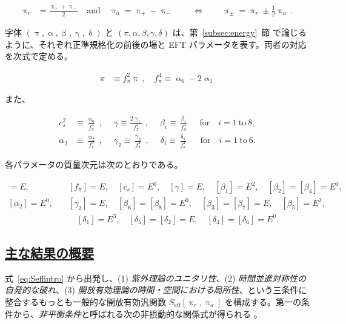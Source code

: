 \documentclass[a4paper,11pt]{ltjsarticle}
\newcommand{\subsectionlink}[1]{\subsection[#1]{\hyperlink{toc}{#1}}}
\numberwithin{equation}{section}
\def\uppia{\uppi_{a}}
\def\uppir{\uppi_{r}}
\newcommand{\Eq}[1]{Eq.~(\ref{#1})}
\newcommand{\Sec}[1]{Sec.~\ref{#1}}
\renewcommand{\Eq}[1]{式~\eqref{#1}}
\renewcommand{\Sec}[1]{第~\ref{#1}~節}
\begin{document}
\begin{align}
\uppi_r &= \frac{\uppi_+ + \uppi_-}{2} \quad \mathrm{and} \quad \uppi_a = \uppi_+ - \uppi_-\, \qquad \Leftrightarrow \qquad  \uppi_\pm =\uppir\pm \frac12 \uppia\,.
\end{align}

字体 $(\uppi,\upalpha,\upbeta,\upgamma,\updelta)$ と $(\pi,\alpha,\beta,\gamma,\delta)$ は、\Sec{subsec:energy} で論じるように、それぞれ正準規格化の前後の場と EFT パラメータを表す。両者の対応を次式で定める。

\begin{align}
\pi &\equiv f_\pi^2 \uppi\,, \quad f_\pi^4 \equiv \upalpha_0 -2 \upalpha_1
\end{align}

また、

\begin{align}
c_s^{2} &\equiv \frac{\upalpha_{0}}{f_\pi^4}\;,\quad\; \gamma \equiv
 \frac{2\upgamma_{1}}{f_\pi^4}\;,\quad\;\beta_{i} \equiv \frac{\upbeta_{i}}{f_{\pi}^{4}}\;\quad\mathrm{for}\quad i = 1 ~\mathrm{to}~8, \\
\alpha_2 &\equiv \frac{\upalpha_2}{f_\pi^4}\;,\quad\; \gamma_2 \equiv \frac{\upgamma_{4}}{f_\pi^4} \;,\quad\; \delta_i \equiv \frac{\updelta_{i}}{f_\pi^4} \quad ~~\mathrm{for}\quad i = 1 ~\mathrm{to}~6.
\end{align}

各パラメータの質量次元は次のとおりである。

\begin{align}
[\pi] = E, &\quad [f_\pi] = E, \quad [c_s] = E^0, \quad [\gamma] = E, \quad [\beta_1] = E^2, \quad [\beta_2] = [\beta_4] = E^0, \\
[\alpha_2] = E^{0}, &\quad [\gamma_2] = E, \quad [\beta_6] =  [\beta_8] = E^0, \quad [\beta_3] = [\beta_7] = E, \quad [\beta_5] = E^2, \\
& \qquad  [\delta_1] = E^3, \quad [\delta_5] = [\delta_2] = E, \quad [\delta_4] = [\delta_6] = E^0  . 
\end{align}

\subsectionlink{主な結果の概要} \label{summary}

\Eq{eq:Seffintro} から出発し、(1) \textit{紫外理論のユニタリ性}、(2) \textit{時間並進対称性の自発的な破れ}、(3) \textit{開放有効理論の時間・空間における局所性}、という三条件に整合するもっとも一般的な開放有効汎関数 $S_{\mathrm{eff}}[\uppi_r,\uppi_a]$ を構成する。第一の条件から、\textit{非平衡条件}と呼ばれる次の非摂動的な関係式が得られる \cite{Crossley:2015evo,Glorioso:2016gsa,Liu:2018kfw}。
\end{document}
